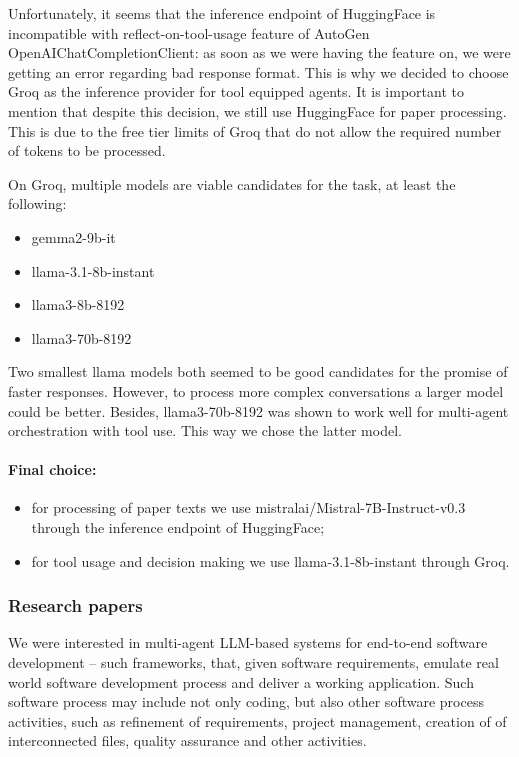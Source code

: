 Unfortunately, it seems that the inference endpoint of HuggingFace is incompatible with reflect-on-tool-usage feature of AutoGen OpenAIChatCompletionClient: as soon as we were having the feature on, we were getting an error regarding bad response format. This is why we decided to choose Groq as the inference provider for tool equipped agents. It is important to mention that despite this decision, we still use HuggingFace for paper processing. This is due to the free tier limits of Groq that do not allow the required number of tokens to be processed.

On Groq, multiple models are viable candidates for the task, at least the following:

\begin{itemize}
	\item gemma2-9b-it
	\item llama-3.1-8b-instant
	\item llama3-8b-8192
	\item llama3-70b-8192
\end{itemize}

Two smallest llama models both seemed to be good candidates for the promise of faster responses. However, to process more complex conversations a larger model could be better. Besides, llama3-70b-8192 was shown to work well for multi-agent orchestration with tool use. This way we chose the latter model. 

\paragraph{Final choice:}

\begin{itemize}
	\item for processing of paper texts we use mistralai/Mistral-7B-Instruct-v0.3 through the inference endpoint of HuggingFace;
	\item for tool usage and decision making we use llama-3.1-8b-instant through Groq.
\end{itemize}


\subsubsection{Research papers}

We were interested in multi-agent LLM-based systems for end-to-end software development -- such frameworks, that, given software requirements, emulate real world software development process and deliver a working application. Such software process  may include not only coding, but also other software process activities, such as refinement of requirements, project management, creation of of interconnected files, quality assurance and other activities. 


